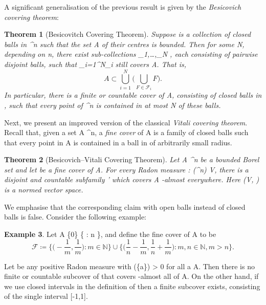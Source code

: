 \documentclass[a4paper, 11pt]{article}
\theoremstyle{plain}
\newtheorem{theorem}{Theorem}[section]
\theoremstyle{definition}
\newtheorem{example}[theorem]{Example}
\theoremstyle{remark}
\newcommand{\norm}[1]{\left\lVert#1\right\rVert}
\numberwithin{equation}{subsection}
\def\({}
\def\){}
\begin{document}
A significant generalisation of the previous result is given by the \emph{Besicovich covering theorem}:

\begin{theorem}[Besicovitch Covering Theorem]
Suppose \(\) is a collection of closed balls in \(^n\) such that the set \(A\) of their centres is bounded. Then for some \(N\), depending on \(n\), there exist sub-collections \(_1,\ldots,_N \subset {}\), each consisting of pairwise disjoint balls, such that \(\bigcup_{i=1}^{N}_i\) still covers \(A\). That is,
\begin{equation}
A \subset \bigcup_{i=1}^{N}\biggl(\bigcup_{F \in \mathcal{F}_i}F\biggr).
\end{equation}
In particular, there is a finite or countable cover of \(A\), consisting of closed balls in \(\), such that every point of \(^{n}\) is contained in at most \(N\) of these balls.
\end{theorem}

Next, we present an improved version of the classical \emph{Vitali covering theorem}. Recall that, given a set \(A \subset {}^{n}\), a \emph{fine cover} of \(A\) is a family \(\) of closed balls such that every point in \(A\) is contained in a ball in \(\) of arbitrarily small radius.

\begin{theorem}[Besicovich--Vitali Covering Theorem]
Let \(A \subset {}^{n}\) be a bounded Borel set and let \(\) be a fine cover of \(A\). For every Radon measure \(\mu : (^{n}) \rightarrow V\), there is a disjoint and countable subfamily \(' \subset {}\) which covers \(A\) \(\mu\)-almost everywhere. Here \((V, \norm{\cdot})\) is a normed vector space.
\end{theorem}

We emphasise that the corresponding claim with open balls instead of closed balls is false. Consider the following example:

\begin{example}
Let \(A \coloneq \{0\} \cup \left\{ : n \in {}\right\}\), and define the fine cover \(\) of \(A\) to be
\begin{equation}
\mathcal{F} \coloneq \biggl\{\biggl(-\frac{1}{m}, \frac{1}{m}\biggr) : m \in \mathbb{N}\biggr\} \cup \biggl\{\biggl(\frac{1}{n}-\frac{1}{m}, \frac{1}{n} + \frac{1}{m}\biggr) : m, n \in \mathbb{N}, m > n \biggr\}.
\end{equation}

Let \(\mu\) be any positive Radon measure with \(\mu(\{a\}) > 0\) for all \(a \in A\). Then there is no finite or countable subcover of \(\) that covers \(\mu\)-almost all of \(A\). On the other hand, if we use closed intervals in the definition of \(\) then a finite subcover exists, consisting of the single interval \([-1,1]\).
\end{example}
\end{document}
